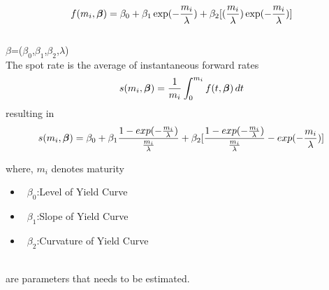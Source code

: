 \documentclass{article}
\begin{document}
\begin{spacing}{1.5}
\begin{equation}
f(m_i,\mbox{\boldmath $\beta$})=\beta_0 +\beta_1 \exp(-\frac{m_i}{\lambda}) +\beta_2 [(\frac{m_i}{\lambda})\exp(-\frac{m_i}{\lambda})]
\end{equation}\\
\mbox{\boldmath $\beta$}=($\beta_0$,$\beta_1$,$\beta_2$,$\lambda$)\\

The spot rate is the average of instantaneous forward rates
\begin{equation}
s(m_i,\mbox{\boldmath $\beta$})=\frac{1}{m_i} \int_0^{m_i}  f(t,\mbox{\boldmath $\beta$}) \, dt
\end{equation}
resulting in
\begin{equation}
s(m_i,\mbox{\boldmath $\beta$})=\beta_0 + \beta_1 \frac{1-exp(-\frac{m_i}{\lambda})}{\frac{m_i}{\lambda}} + \beta_2 [\frac{1-exp(-\frac{m_i}{\lambda})}{\frac{m_i}{\lambda}}-exp(-\frac{m_i}{\lambda})]
\end{equation}

where,
$m_i$ denotes maturity
\begin{itemize}
\item\ $\beta_0$:Level of Yield Curve
\item\ $\beta_1$:Slope of Yield Curve    
\item\ $\beta_2$:Curvature of Yield Curve
\end{itemize}\\ are parameters that needs to be estimated.

\end{spacing}
\end{document}
